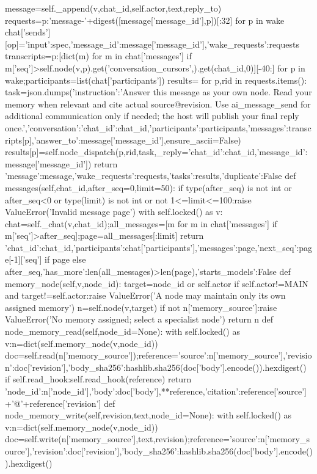    message=self._append(v,chat_id,self.actor,text,reply_to)
   requests={p:'message-'+digest([message['message_id'],p])[:32] for p in wake}
   chat['sends'][op]={'input':spec,'message_id':message['message_id'],'wake_requests':requests}
   transcripts={p:[dict(m) for m in chat['messages'] if m['seq']>self.node(v,p).get('conversation_cursors',{}).get(chat_id,0)][-40:] for p in wake};participants=list(chat['participants'])
  results={}
  for p,rid in requests.items():
   task=json.dumps({'instruction':'Answer this message as your own node. Read your memory when relevant and cite actual source@revision. Use ai_message_send for additional communication only if needed; the host will publish your final reply once.','conversation':{'chat_id':chat_id,'participants':participants,'messages':transcripts[p]},'answer_to':message['message_id']},ensure_ascii=False)
   results[p]=self.node_dispatch(p,rid,task,_reply={'chat_id':chat_id,'message_id':message['message_id']})
  return {'message':message,'wake_requests':requests,'tasks':results,'duplicate':False}
 def messages(self,chat_id,after_seq=0,limit=50):
  if type(after_seq) is not int or after_seq<0 or type(limit) is not int or not 1<=limit<=100:raise ValueError('Invalid message page')
  with self.locked() as v:
   chat=self._chat(v,chat_id);all_messages=[m for m in chat['messages'] if m['seq']>after_seq];page=all_messages[:limit]
   return {'chat_id':chat_id,'participants':chat['participants'],'messages':page,'next_seq':page[-1]['seq'] if page else after_seq,'has_more':len(all_messages)>len(page),'starts_models':False}
 def memory_node(self,v,node_id):
  target=node_id or self.actor
  if self.actor!=MAIN and target!=self.actor:raise ValueError('A node may maintain only its own assigned memory')
  n=self.node(v,target)
  if not n['memory_source']:raise ValueError('No memory assigned; select a specialist node')
  return n
 def node_memory_read(self,node_id=None):
  with self.locked() as v:n=dict(self.memory_node(v,node_id))
  doc=self.read(n['memory_source']);reference={'source':n['memory_source'],'revision':doc['revision'],'body_sha256':hashlib.sha256(doc['body'].encode()).hexdigest()}
  if self.read_hook:self.read_hook(reference)
  return {'node_id':n['node_id'],'body':doc['body'],**reference,'citation':reference['source']+'@'+reference['revision']}
 def node_memory_write(self,revision,text,node_id=None):
  with self.locked() as v:n=dict(self.memory_node(v,node_id))
  doc=self.write(n['memory_source'],text,revision);reference={'source':n['memory_source'],'revision':doc['revision'],'body_sha256':hashlib.sha256(doc['body'].encode()).hexdigest()}
